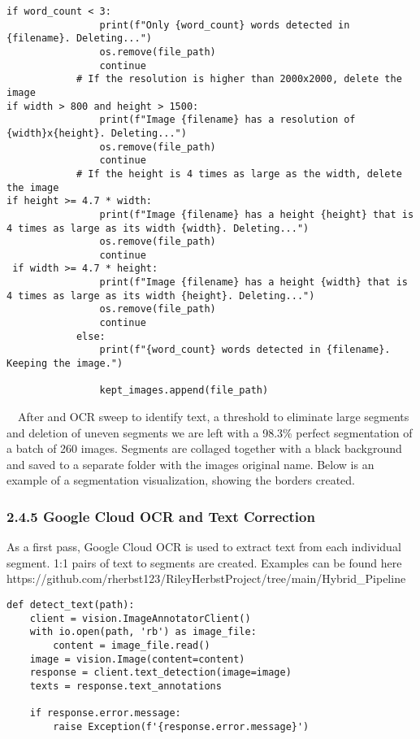 \documentclass{article}
\begin{document}
\begingroup\footnotesize
\begin{verbatim}
if word_count < 3:
                print(f"Only {word_count} words detected in {filename}. Deleting...")
                os.remove(file_path)
                continue
            # If the resolution is higher than 2000x2000, delete the image
if width > 800 and height > 1500:
                print(f"Image {filename} has a resolution of {width}x{height}. Deleting...")
                os.remove(file_path)
                continue
            # If the height is 4 times as large as the width, delete the image
if height >= 4.7 * width:
                print(f"Image {filename} has a height {height} that is 4 times as large as its width {width}. Deleting...")
                os.remove(file_path)
                continue
 if width >= 4.7 * height:
                print(f"Image {filename} has a height {width} that is 4 times as large as its width {height}. Deleting...")
                os.remove(file_path)
                continue
            else:
                print(f"{word_count} words detected in {filename}. Keeping the image.")

                kept_images.append(file_path)
\end{verbatim}
\endgroup

$\quad$After and OCR sweep to identify text, a threshold to eliminate large segments and deletion of uneven segments we are left with a 98.3\% perfect segmentation of a batch of 260 images. Segments are collaged together with a black background and saved to a separate folder with the images original name. Below is an example of a segmentation visualization, showing the borders created.





\subsubsection*{2.4.5 Google Cloud OCR and Text Correction}
As a first pass, Google Cloud OCR is used to extract text from each individual segment. 1:1 pairs of text to segments are created. Examples can be found here https://github.com/rherbst123/RileyHerbstProject/tree/main/Hybrid_Pipeline
\begingroup\footnotesize
\begin{verbatim}
def detect_text(path):
    client = vision.ImageAnnotatorClient()
    with io.open(path, 'rb') as image_file:
        content = image_file.read()
    image = vision.Image(content=content)
    response = client.text_detection(image=image)
    texts = response.text_annotations
    
    if response.error.message:
        raise Exception(f'{response.error.message}')
\end{verbatim}
\endgroup
\end{document}
